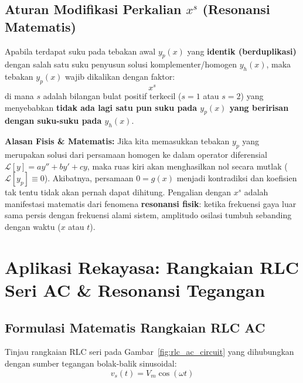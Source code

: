 \documentclass[11pt,a4paper]{article}
\theoremstyle{definition}
\begin{document}
\subsection{Aturan Modifikasi Perkalian \texorpdfstring{$x^s$}{x\textasciicircum s} (Resonansi Matematis)}

\begin{tcolorbox}[colback=yellow!8!white,colframe=orange!80!black,title=\textbf{Aturan Modifikasi Krusial (Resonansi Alami-Paksa)}]
Apabila terdapat suku pada tebakan awal $y_p(x)$ yang \textbf{identik (berduplikasi)} dengan salah satu suku penyusun solusi komplementer/homogen $y_h(x)$, maka tebakan $y_p(x)$ wajib dikalikan dengan faktor:
\begin{equation}
    x^s
\end{equation}
di mana $s$ adalah bilangan bulat positif terkecil ($s = 1$ atau $s = 2$) yang menyebabkan \textbf{tidak ada lagi satu pun suku pada $y_p(x)$ yang beririsan dengan suku-suku pada $y_h(x)$}.
\end{tcolorbox}

\textbf{Alasan Fisis \& Matematis:}
Jika kita memasukkan tebakan $y_p$ yang merupakan solusi dari persamaan homogen ke dalam operator diferensial $\mathcal{L}[y] = a y'' + b y' + c y$, maka ruas kiri akan menghasilkan nol secara mutlak ($\mathcal{L}[y_p] \equiv 0$). Akibatnya, persamaan $0 = g(x)$ menjadi kontradiksi dan koefisien tak tentu tidak akan pernah dapat dihitung. Pengalian dengan $x^s$ adalah manifestasi matematis dari fenomena \textbf{resonansi fisik}: ketika frekuensi gaya luar sama persis dengan frekuensi alami sistem, amplitudo osilasi tumbuh sebanding dengan waktu ($x$ atau $t$).

\section{Aplikasi Rekayasa: Rangkaian RLC Seri AC \& Resonansi Tegangan}

\subsection{Formulasi Matematis Rangkaian RLC AC}

Tinjau rangkaian RLC seri pada Gambar~\ref{fig:rlc_ac_circuit} yang dihubungkan dengan sumber tegangan bolak-balik sinusoidal:
\begin{equation}
    v_s(t) = V_m \cos(\omega t)
    \label{eq:ac_source}
\end{equation}
\end{document}
